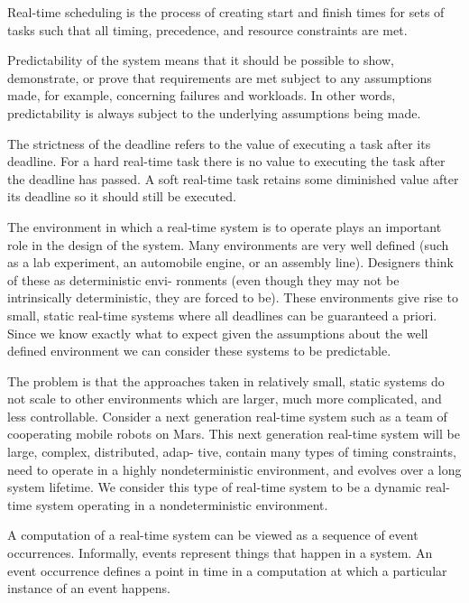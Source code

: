 \documentclass[12pt]{article}
\begin{document}
Real-time scheduling is the process of creating start and finish times for sets of tasks such that
all timing, precedence, and resource constraints are met.


\iffalse

Predictability of the system means that it should be possible to show, demonstrate, or prove that requirements are
met subject to any assumptions made, for example, concerning failures and workloads. In other words, 
predictability is always subject to the underlying assumptions being made.

The strictness of the deadline refers to the value of executing a task after its deadline. For a hard real-time 
task there is no value to executing the task after the deadline has passed. A soft real-time task retains some 
diminished value after its deadline so it should still be executed.

The environment in which a real-time system is to operate plays an important role in the
design of the system. Many environments are very well defined (such as a lab experiment,
an automobile engine, or an assembly line). Designers think of these as deterministic envi-
ronments (even though they may not be intrinsically deterministic, they are forced to be).
These environments give rise to small, static real-time systems where all deadlines can
be guaranteed a priori. Since we know exactly what to expect given the assumptions about the 
well defined environment we can consider these systems to be predictable.

The problem is that the approaches taken in relatively small, static systems do not scale
to other environments which are larger, much more complicated, and less controllable.
Consider a next generation real-time system such as a team of cooperating mobile robots
on Mars. This next generation real-time system will be large, complex, distributed, adap-
tive, contain many types of timing constraints, need to operate in a highly nondeterministic
environment, and evolves over a long system lifetime. We consider this type of real-time system to be
a dynamic real-time system operating in a nondeterministic environment. \cite{stankovic1990predictability}

A computation of a real-time system can be viewed as a sequence of event occurrences. Informally, 
events represent things that happen in a system. An event occurrence defines a point in time in a
computation at which a particular instance of an event happens. \cite{chodrow1991run}
\end{document}
